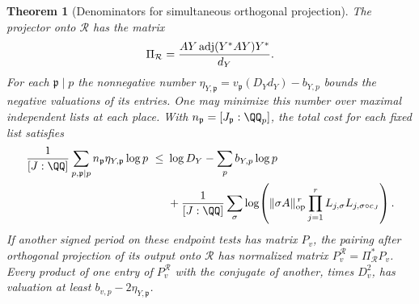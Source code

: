 \documentclass[a4paper,11pt]{article}
\newtheorem{theorem}[proposition]{Theorem}
\theoremstyle{definition}
\theoremstyle{remark}
\numberwithin{equation}{section}
\begin{document}
\begin{theorem}[Denominators for simultaneous orthogonal projection]\leavevmode
\label{thm:jointimage318}
The projector onto \(\mathcal R\) has the matrix
\[
 \Pi_{\mathcal R}
     ={A Y\operatorname{adj}(Y^* A Y)Y^*\over d_Y}.
\]
For each \(\mathfrak p\mid p\) the nonnegative number
\(\eta_{Y,\mathfrak p}=v_{\mathfrak p}(D_Yd_Y)-b_{Y,p}\)
bounds the negative valuations of its entries. One may
minimize this number over maximal independent lists at each
place. With \(n_{\mathfrak p}=[J_{\mathfrak p}:\QQ_p]\),
the total cost for each fixed list satisfies
\[
\begin{split}
 {1\over[J:\QQ]}\sum_{p,\mathfrak p\mid p}
         n_{\mathfrak p}\eta_{Y,\mathfrak p}\log p
 \ \le\ &\log D_Y-\sum_p b_{Y,p}\log p\\
 &+{1\over[J:\QQ]}\sum_\sigma\log\!\left(
 \|\sigma A\|_{\rm op}^{\,r}
       \prod_{j=1}^r L_{j,\sigma}L_{j,\sigma\circ c_J}\right).
\end{split}
\]
If another signed period on these endpoint tests has matrix
\(P_v\), the pairing after orthogonal projection of its
output onto \(\mathcal R\) has normalized matrix
\(P_v^{\mathcal R}=\Pi_{\mathcal R}^*P_v\).
Every product of one entry of \(P_v^{\mathcal R}\) with the
conjugate of another, times \(D_v^2\), has valuation at
least \(b_{v,p}-2\eta_{Y,\mathfrak p}\).
\end{theorem}
\end{document}
